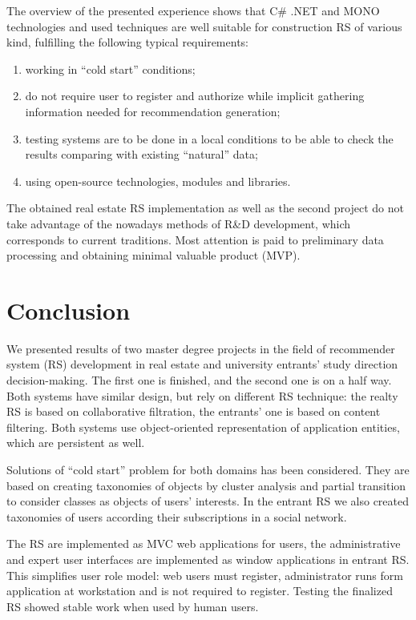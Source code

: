 \documentclass[conference]{IEEEtran}
\begin{document}
The overview of the presented experience shows that C\# .NET and MONO technologies and used techniques are well suitable for construction RS of various kind, fulfilling the following typical requirements:
\begin{enumerate}
\item working in ``cold start'' conditions;
\item do not require user to register and authorize while implicit gathering information needed for recommendation generation;
\item testing systems are to be done in a local conditions to be able to check the results comparing with existing ``natural'' data;
\item using open-source technologies, modules and libraries.
\end{enumerate}

The obtained real estate RS implementation as well as the second project do not take advantage of the nowadays methods of R\&D development, which corresponds to current traditions.  Most attention is paid to preliminary data processing and obtaining minimal valuable product (MVP).

\section*{Conclusion}
\label{sec:conc}

We presented results of two master degree projects in the field of recommender system (RS) development in real estate and university entrants' study direction decision-making.  The first one is finished, and the second one is on a half way.  Both systems have similar design, but rely on different RS technique: the realty RS is based on collaborative filtration, the entrants' one is based on content filtering.  Both systems use object-oriented representation of application entities, which are persistent as well.

Solutions of ``cold start'' problem for both domains has been considered.  They are based on creating taxonomies of objects by cluster analysis and partial transition to consider classes as objects of users' interests.  In the entrant RS we also created taxonomies of users according their subscriptions in a social network.

The RS are implemented as MVC web applications for users, the administrative and expert user interfaces are implemented as window applications in entrant RS.  This simplifies user role model: web users must register, administrator runs form application at workstation and is not required to register.  Testing the finalized RS showed stable work when used by human users.
\end{document}
